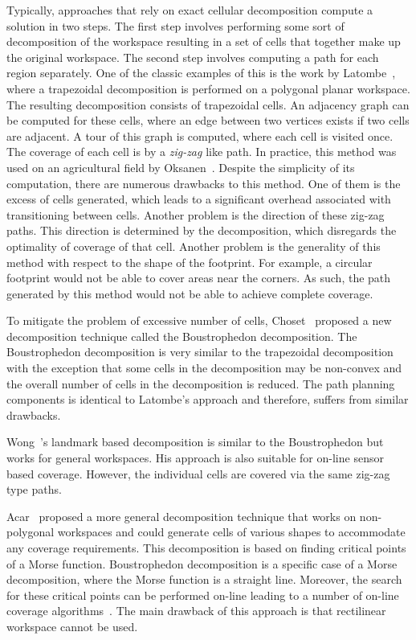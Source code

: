 \documentclass[../main.tex]{subfiles}
\begin{document}
Typically, approaches that rely on exact cellular decomposition compute a solution in two steps. The first step involves performing some sort of decomposition of the workspace resulting in a set of cells that together make up the original workspace. The second step involves computing a path for each region separately. One of the classic examples of this is the work by Latombe~\cite{latombe1991exact}, where a trapezoidal decomposition is performed on a polygonal planar workspace. The resulting decomposition consists of trapezoidal cells. An adjacency graph can be computed for these cells, where an edge between two vertices exists if two cells are adjacent. A tour of this graph is computed, where each cell is visited once. The coverage of each cell is by a \emph{zig-zag} like path.  In practice, this method was used on an agricultural field by Oksanen~\cite{Oksanen2009coverage}. Despite the simplicity of its computation, there are numerous drawbacks to this method. One of them is the excess of cells generated, which leads to a significant overhead associated with transitioning between cells. Another problem is the direction of these zig-zag paths. This direction is determined by the decomposition, which disregards the optimality of coverage of that cell. Another problem is the generality of this method with respect to the shape of the footprint. For example, a circular footprint would not be able to cover areas near the corners. As such, the path generated by this method would not be able to achieve complete coverage.

To mitigate the problem of excessive number of cells, Choset~\cite{choset2000coverage} proposed a new decomposition technique called the Boustrophedon decomposition. The Boustrophedon decomposition is very similar to the trapezoidal decomposition with the exception that some cells in the decomposition may be non-convex and the overall number of cells in the decomposition is reduced. The path planning components is identical to Latombe's approach and therefore, suffers from similar drawbacks.

Wong~\cite{wong2004complete}'s landmark based decomposition is similar to the Boustrophedon but works for general workspaces. His approach is also suitable for on-line sensor based coverage. However, the individual cells are covered via the same zig-zag type paths.

Acar~\cite{Acar2002morse} proposed a more general decomposition technique that works on non-polygonal workspaces and could generate cells of various shapes to accommodate any coverage requirements. This decomposition is based on finding critical points of a Morse function. Boustrophedon decomposition is a specific case of a Morse decomposition, where the Morse function is a straight line. Moreover, the search for these critical points can be performed on-line leading to a number of on-line coverage algorithms~\cite{acar2002sensor}. The main drawback of this approach is that rectilinear workspace cannot be used. 
\end{document}

